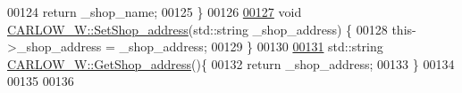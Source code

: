\begin{DoxyCode}
00124     \textcolor{keywordflow}{return} \_shop\_name;
00125 \}
00126 
\hypertarget{_c_a_r_l_o_w___w_8cpp_source.tex_l00127}{}\hyperlink{class_c_a_r_l_o_w___w_a6f66cd4c060b2b1ac6640768ad5c56e4}{00127} \textcolor{keywordtype}{void} \hyperlink{class_c_a_r_l_o_w___w_a6f66cd4c060b2b1ac6640768ad5c56e4}{CARLOW\_W::SetShop\_address}(std::string \_shop\_address) \{
00128     this->\_shop\_address = \_shop\_address;
00129 \}
00130 
\hypertarget{_c_a_r_l_o_w___w_8cpp_source.tex_l00131}{}\hyperlink{class_c_a_r_l_o_w___w_af48a2f69706be684115758820ce79ddd}{00131} std::string \hyperlink{class_c_a_r_l_o_w___w_af48a2f69706be684115758820ce79ddd}{CARLOW\_W::GetShop\_address}()\{
00132     \textcolor{keywordflow}{return} \_shop\_address;
00133 \}
00134 
00135 
00136 
\end{DoxyCode}
